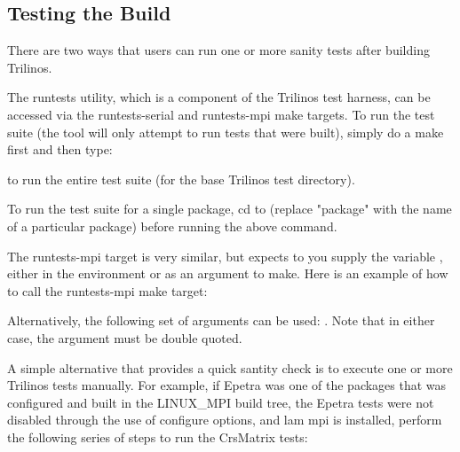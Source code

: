 \documentclass[12pt,relax]{TrilinosUserGuide}
\begin{document}



\subsection{Testing the Build}
\label{subsect:TestHarness}

There are two ways that users can run one or more sanity tests after building
Trilinos.


The runtests utility, which is a component of the Trilinos test
harness, can be accessed via the runtests-serial and runtests-mpi make
targets.
To run the test suite (the tool will only attempt to run tests that were 
built), simply do a make first and then type:


to run the entire test suite (for the base Trilinos test directory).

To run the test suite for a single package, cd to 
 (replace "package" with the name of a 
particular package) before running the above command.

The runtests-mpi target is very similar, but expects to you supply the 
variable , either in the environment or as an
argument to make.  Here is an example of how to call the runtests-mpi make 
target: 


Alternatively, the following set of arguments can be used: \newline
{}.
Note that in either case, the  argument
must be double quoted.

A simple alternative that provides a quick santity check is to execute one
or more Trilinos tests manually.  For example, if Epetra was one of the 
packages that was configured and built in the LINUX\_MPI build tree, the 
Epetra tests were not disabled through the use of configure options, and
lam mpi is installed, perform 
the following series of steps to run the CrsMatrix tests:
\end{document}
